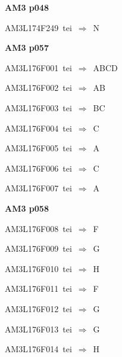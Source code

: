\par\vfill\eject
{\bf\hfill AM3 p048\hfill\hbox{}}\par\bigskip
{\sixrm AM3L174F249\ {\sixit tei}\ }$\Rightarrow$\ N\par\smallskip

\par\vfill\eject
{\bf\hfill AM3 p057\hfill\hbox{}}\par\bigskip
{\sixrm AM3L176F001\ {\sixit tei}\ }$\Rightarrow$\ ABCD\par\smallskip
{\sixrm AM3L176F002\ {\sixit tei}\ }$\Rightarrow$\ AB\par\smallskip
{\sixrm AM3L176F003\ {\sixit tei}\ }$\Rightarrow$\ BC\par\smallskip
{\sixrm AM3L176F004\ {\sixit tei}\ }$\Rightarrow$\ C\par\smallskip
{\sixrm AM3L176F005\ {\sixit tei}\ }$\Rightarrow$\ A\par\smallskip
{\sixrm AM3L176F006\ {\sixit tei}\ }$\Rightarrow$\ {\tenit C}\par\smallskip
{\sixrm AM3L176F007\ {\sixit tei}\ }$\Rightarrow$\ {\tenit A}\par\smallskip

\par\vfill\eject
{\bf\hfill AM3 p058\hfill\hbox{}}\par\bigskip
{\sixrm AM3L176F008\ {\sixit tei}\ }$\Rightarrow$\ F\par\smallskip
{\sixrm AM3L176F009\ {\sixit tei}\ }$\Rightarrow$\ G\par\smallskip
{\sixrm AM3L176F010\ {\sixit tei}\ }$\Rightarrow$\ {\tenit H}\par\smallskip
{\sixrm AM3L176F011\ {\sixit tei}\ }$\Rightarrow$\ {\tenit F}\par\smallskip
{\sixrm AM3L176F012\ {\sixit tei}\ }$\Rightarrow$\ {\tenit G}\par\smallskip
{\sixrm AM3L176F013\ {\sixit tei}\ }$\Rightarrow$\ {\tenit G}\par\smallskip
{\sixrm AM3L176F014\ {\sixit tei}\ }$\Rightarrow$\ {\tenit H}\par\smallskip

